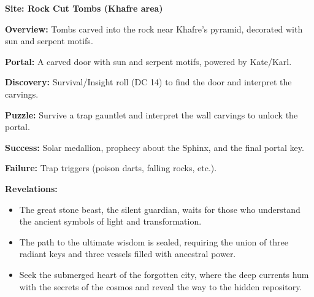 \documentclass[12pt]{article}
\begin{document}
\textbf{Site: Rock Cut Tombs (Khafre area)}

\textbf{Overview:}  
Tombs carved into the rock near Khafre's pyramid, decorated with sun and serpent motifs.

\textbf{Portal:}  
A carved door with sun and serpent motifs, powered by Kate/Karl.

\textbf{Discovery:}  
Survival/Insight roll (DC 14) to find the door and interpret the carvings.

\textbf{Puzzle:}  
Survive a trap gauntlet and interpret the wall carvings to unlock the portal.

\textbf{Success:}  
Solar medallion, prophecy about the Sphinx, and the final portal key.

\textbf{Failure:}  
Trap triggers (poison darts, falling rocks, etc.).

\textbf{Revelations:}
\begin{itemize}
  \item The great stone beast, the silent guardian, waits for those who understand the ancient symbols of light and transformation.
  \item The path to the ultimate wisdom is sealed, requiring the union of three radiant keys and three vessels filled with ancestral power.
  \item Seek the submerged heart of the forgotten city, where the deep currents hum with the secrets of the cosmos and reveal the way to the hidden repository.
\end{itemize}
\end{document}
